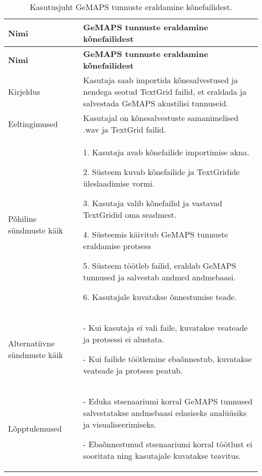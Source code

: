 \begin{longtable}{|p{2.5cm}|p{11cm}|}
    \caption{Kasutusjuht GeMAPS tunnuste eraldamine kõnefailidest.}
    \label{tab:kasutusjuht1}\\ \hline
    \textbf{Nimi} &  \textbf{GeMAPS tunnuste eraldamine kõnefailidest}  \\
    \hline
    \endfirsthead
    \hline
    \textbf{Nimi} &  \textbf{GeMAPS tunnuste eraldamine kõnefailidest}  \\
    \hline
    \endhead
    \hline
    \endfoot
    \hline
    \endlastfoot
    Kirjeldus & Kasutaja saab importida kõnesalvestused ja nendega seotud TextGrid failid, et eraldada ja salvestada GeMAPS akustilisi tunnuseid.\\ \hline
    Eeltingimused & Kasutajal on kõnesalvestuste samanimelised .wav ja TextGrid failid.\\ \hline
    Põhiline sündmuste käik & 
    1. Kasutaja avab kõnefailide importimise akna.
    
    2. Süsteem kuvab kõnefailide ja TextGridide üleslaadimise vormi.
    
    3. Kasutaja valib kõnefailid ja vastavad TextGridid oma seadmest.
    
    4. Süsteemis käivitub GeMAPS tunnuste eraldamise protsess
    
    5. Süsteem töötleb failid, eraldab GeMAPS tunnused ja salvestab andmed andmebaasi.
    
    6. Kasutajale kuvatakse õnnestumise teade.
    \\ \hline
    Alternatiivne sündmuste käik & 
    - Kui kasutaja ei vali faile, kuvatakse veateade ja protsessi ei alustata.
    
    - Kui failide töötlemine ebaõnnestub, kuvatakse veateade ja protsess peatub.
    \\ \hline
    Lõpptulemused & 
    - Eduka stsenaariumi korral GeMAPS tunnused salvestatakse andmebaasi edasiseks analüüsiks ja visualiseerimiseks.
    
    - Ebaõnnestunud stsenaariumi korral töötlust ei sooritata ning kasutajale kuvatakse teavitus.
    \\ \hline
\end{longtable}

